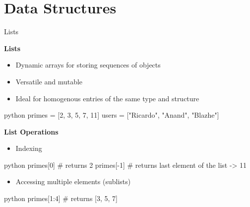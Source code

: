 \documentclass[
	11pt, 
]{beamer}
\begin{document}
\section{Data Structures}
\begin{frame}[fragile]{Lists}

\textbf{Lists}
\begin{itemize}
    \item Dynamic arrays for storing sequences of objects
    \item Versatile and mutable
    \item Ideal for homogenous entries of the same type and structure
\end{itemize}

\begin{mintedbox}{python}
primes = [2, 3, 5, 7, 11]
users = ["Ricardo", "Anand", "Blazhe"]
\end{mintedbox} 

\textbf{List Operations}

\begin{itemize}
    \item Indexing
\end{itemize}
\begin{mintedbox}{python}
primes[0] # returns 2 
primes[-1] # returns last element of the list -> 11
\end{mintedbox} 
\begin{itemize}
    \item Accessing multiple elements (sublists)
\end{itemize}
 \begin{mintedbox}{python}
primes[1:4] # returns [3, 5, 7]
\end{mintedbox}    
\end{frame}


\end{document}
